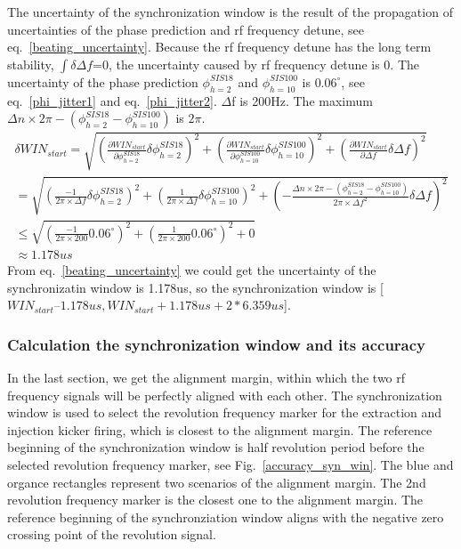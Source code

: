 The uncertainty of the synchronization window is the result of the propagation of
uncertainties of the phase prediction and rf frequency detune, see eq.~\ref{beating_uncertainty}. Because the rf frequency detune has the long term stability, $\int\delta \Delta f$=0, the uncertainty caused by rf frequency detune is 0. The uncertainty of the phase prediction $\phi_{h=2}^{SIS18}$ and $\phi_{h=10}^{SIS100}$ is $0.06^\circ$, see eq.~\ref{phi_jitter1} and eq.~\ref{phi_jitter2}. $\Delta$f is 200Hz. The maximum ${\Delta n} \times {2\pi} - (\phi_{h=2}^{SIS18}-\phi_{h=10}^{SIS100})$ is $2\pi$.
\begin{equation}
\begin{aligned}
\delta WIN_{start} =\sqrt {(\frac {\partial WIN_{start}}{\partial \phi_{h=2}^{SIS18}}\delta \phi_{h=2}^{SIS18})^2 + (\frac {\partial WIN_{start}}{\partial \phi_{h=10}^{SIS100}}\delta \phi_{h=10}^{SIS100})^2+(\frac {\partial WIN_{start}}{\partial \Delta f}\delta \Delta f)^2} \\
 =\sqrt {(\frac{-1}{{2\pi} \times {\Delta f}}\delta \phi_{h=2}^{SIS18})^2+(\frac{1}{{2\pi} \times {\Delta f}}\delta \phi_{h=10}^{SIS100})^2+(-\frac{{\Delta n} \times {2\pi} - (\phi_{h=2}^{SIS18}-\phi_{h=10}^{SIS100})}{{2\pi} \times {\Delta f}^2}\delta \Delta f)^2} \\
\le \sqrt {(\frac{-1}{{2\pi} \times {200}}0.06^\circ)^2+(\frac{1}{{2\pi} \times {200}}0.06^\circ)^2+0}\\
\approx 1.178us \label{beating_uncertainty}
\end{aligned}
\end{equation}
From eq.~\ref{beating_uncertainty} we could get the uncertainty of the synchronizatin window is 1.178us, so the synchronization window is [$WIN_{start} – 1.178us, WIN_{start} + 1.178us + 2 * 6.359us$].
\subsubsection{Calculation the synchronization window and its accuracy}
In the last section, we get the alignment margin, within which the two rf frequency signals will be perfectly aligned with each other. The synchronization window is used to select the revolution frequency marker for the extraction and injection kicker firing, which is closest to the alignment margin. The reference beginning of the synchronization window is half revolution period before the selected revolution frequency marker, see Fig.~\ref{accuracy_syn_win}. The blue and organce rectangles represent two scenarios of the alignment margin. The 2nd revolution frequency marker is the closest one to the alignment margin. The reference beginning of the synchronziation window aligns with the negative zero crossing point of the revolution signal.

